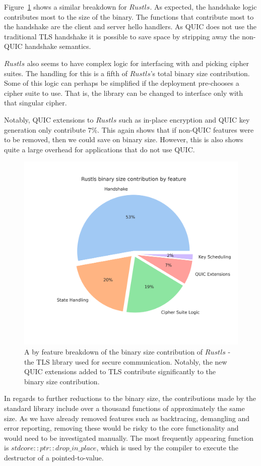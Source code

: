 Figure~\ref{fig:tls_bin_func} shows a similar breakdown for $Rustls$.
As expected, the handshake logic contributes most to the size of the binary.
The functions that contribute most to the handshake are the client and server hello handlers.
As QUIC does not use the traditional TLS handshake it is possible to save space by stripping away the non-QUIC handshake semantics.

$Rustls$ also seems to have complex logic for interfacing with and picking cipher suites.
The handling for this is a fifth of $Rustls$'s total binary size contribution.
Some of this logic can perhaps be simplified if the deployment pre-chooses a cipher suite to use.
That is, the library can be changed to interface only with that singular cipher.

Notably, QUIC extensions to $Rustls$ such as in-place encryption and QUIC key generation only contribute $7\%$.
This again shows that if non-QUIC features were to be removed, then we could save on binary size.
However, this is also shows quite a large overhead for applications that do not use QUIC.

\begin{figure}[ht]
    \centering
    \includegraphics[width=0.75\linewidth]{images/rustls_binary_by_function.png}
    \caption{A by feature breakdown of the binary size contribution of $Rustls$ - the TLS library used for secure communication. Notably, the new QUIC extensions added to TLS contribute significantly to the binary size contribution.}
    \label{fig:tls_bin_func}
\end{figure}

In regards to further reductions to the binary size, the contributions made by the standard library include over a thousand functions of approximately the same size.
As we have already removed features such as backtracing, demangling and error reporting, removing these would be risky to the core functionality and would need to be investigated manually.
The most frequently appearing function is $std core::ptr::drop\_in\_place$, which is used by the compiler to execute the destructor of a pointed-to-value.

